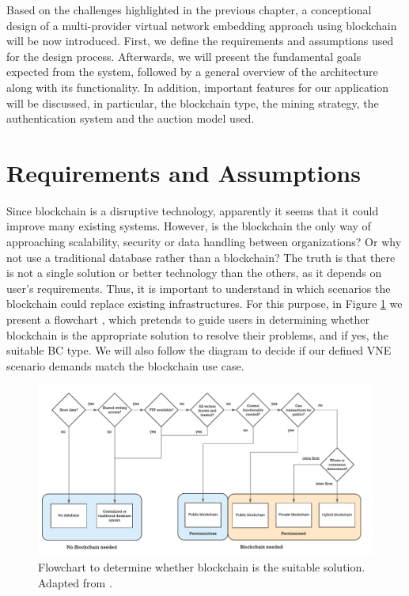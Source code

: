 Based on the challenges highlighted in the previous chapter, a conceptional design of a multi-provider virtual network embedding approach using blockchain will be now introduced. First, we define the requirements and assumptions used for the design process. Afterwards, we will present the fundamental goals expected from the system, followed by a general overview of the architecture along with its functionality. In addition, important features for our application will be discussed, in particular, the blockchain type, the mining strategy, the authentication system and the auction model used.

\section{Requirements and Assumptions} \label{requirements}

Since blockchain is a disruptive technology, apparently it seems that it could improve many existing systems. However, is the blockchain the only way of approaching scalability, security or data handling between organizations? Or why not use a traditional database rather than a blockchain? The truth is that there is not a single solution or better technology than the others, as it depends on user's requirements. Thus, it is important to understand in which scenarios the blockchain could replace existing infrastructures. For this purpose, in Figure \ref{fig:bcFlowchart} we present a flowchart \citep{wust2017you}, which pretends to guide users in determining whether blockchain is the appropriate solution to resolve their problems, and if yes, the suitable BC type. We will also follow the diagram to decide if our defined VNE scenario demands match the blockchain use case.

\begin{figure}[bth]
	\centering
	\includegraphics[width=1\linewidth]{gfx/bcFlowchart}    
  	\caption{Flowchart to determine whether blockchain is the suitable solution. Adapted from \citep{wust2017you}.}
  	\label{fig:bcFlowchart}
\end{figure}

